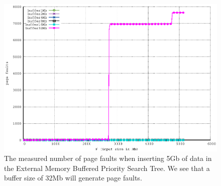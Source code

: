 \documentclass[twoside,11pt,openright]{report}
\begin{document}
\begin{figure}[h]
\centering
\includegraphics[width=1\textwidth]{../src/experiments/gerth_buffer_size_experiment_results/2016-05-03.13_51_54/pfs}
\caption{The measured number of page faults when inserting 5Gb of data in the External Memory Buffered Priority Search Tree. We see that a buffer size of 32Mb will generate page faults.}
\label{fig:page_faults_gerth_buffer_size}
\end{figure}
\end{document}

